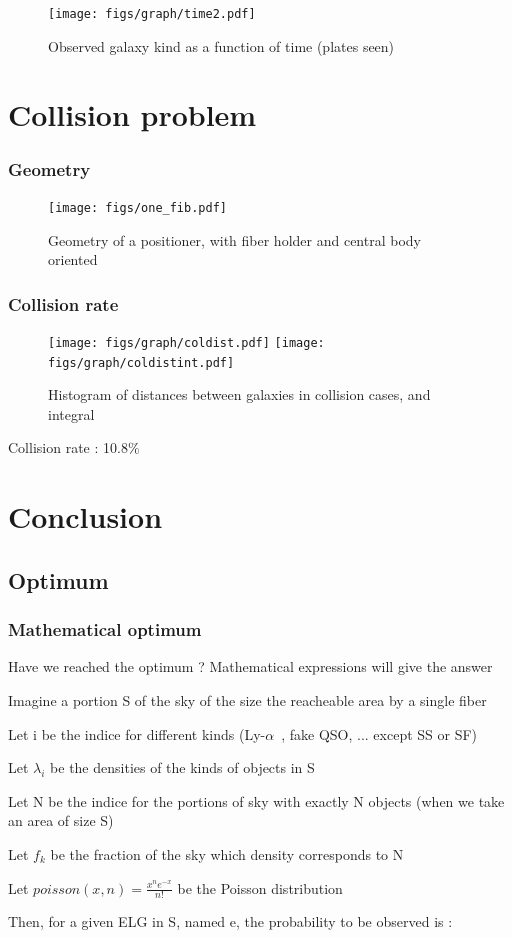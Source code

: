 \documentclass{beamer}
\def\lya{Ly-$\alpha$\ }
\begin{document}
\begin{frame}
\begin{figure}[H]\begin{center}
	\texttt{[image: figs/graph/time2.pdf]}
	\caption{Observed galaxy kind as a function of time (plates seen)}
\end{center}\end{figure}
\end{frame}





\section{Collision problem}
\begin{frame}\frametitle{Geometry}
\begin{figure}[H]\begin{center}
	\texttt{[image: figs/one\_fib.pdf]}
	\caption{Geometry of a positioner, with fiber holder and central body oriented}\label{onefib}
\end{center}\end{figure}
\end{frame}

\begin{frame}\frametitle{Collision rate}
\begin{figure}[H]\begin{center}
	\texttt{[image: figs/graph/coldist.pdf]}
	\texttt{[image: figs/graph/coldistint.pdf]}
	\caption{Histogram of distances between galaxies in collision cases, and integral}\label{coldist}
\end{center}\end{figure}
Collision rate : 10.8\%
\end{frame}


\section{Conclusion}
\subsection{Optimum}
\begin{frame}\frametitle{Mathematical optimum}
Have we reached the optimum ? Mathematical expressions will give the answer

Imagine a portion S of the sky of the size the reacheable area by a single fiber

Let i be the indice for different kinds (\lya, fake QSO, ... except SS or SF)

Let $\lambda_{i}$ be the densities of the kinds of objects in S

Let N be the indice for the portions of sky with exactly N objects (when we take an area of size S)

Let $f_{k}$ be the fraction of the sky which density corresponds to N

Let $poisson(x,n) = \frac{x^{n}e^{-x}}{n!}$ be the Poisson distribution

Then, for a given ELG in S, named e, the probability to be observed is :
\end{frame}
\end{document}
